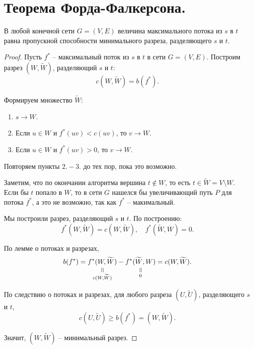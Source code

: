 \section{Теорема Форда-Фалкерсона.}

\begin{theorem}
    В любой конечной сети $ G = (V,E) $ величина максимального потока из $ s $ в $ t $ равна пропускной способности минимального разреза, разделяющего $ s $ и $ t $.
\end{theorem}

\begin{proof}
    Пусть $ f^* $ -- максимальный поток из $ s $ в $ t $ в сети $ G = (V,E) $. Построим разрез $ (W,\widetilde{W}) $, разделяющий $ s $ и $ t $:
    \[
        c(W,\widetilde{W}) = b(f^*).
    \]

    \begin{note}
        Формируем множество $ \widetilde{W} $:
        \begin{enumerate}
            \item $ s \rightarrow W $.
            \item Если $ u \in W $ и $ f^*(uv) < c(uv) $, то $ v \rightarrow W $.
            \item Если $ u \in W $ и $ f^*(uv) > 0 $, то $ v \rightarrow W $.
        \end{enumerate}

        Повторяем пункты $ 2.-3. $ до тех пор, пока это возможно.
    \end{note}

    Заметим, что по окончании алгоритма вершина $ t \notin W $, то есть $ t \in \widetilde{W} = V \setminus W $. Если бы $ t $ попало в $ W $, то в сети $ G $ нашелся бы увеличивающий путь $ P $ для потока $ f^* $, а это не возможно, так как $ f^* $ -- макимальный.

    Мы построили разрез, разделяющий $ s $ и $ t $. По построению:
    \[
        f^*(W,\widetilde{W}) = c(W,\widetilde{W}), \quad f^*(\widetilde{W},W) = 0.
    \]

    По лемме о потоках и разрезах,
    \[
        b(f^*) = \equalto{f^*(W,\widetilde{W})}{c(W,\widetilde{W})} - \equalto{f^*(\widetilde{W},W)}{0} = c(W,\widetilde{W}).
    \]

    По следствию о потоках и разрезах, для любого разреза $ (U,\widetilde{U}) $, разделяющего $ s $ и $ t $,
    \[
        c(U,\widetilde{U}) \geqslant b(f^*) = (W,\widetilde{W}).
    \]

    Значит, $ (W,\widetilde{W}) $ -- минимальный разрез.
\end{proof}

